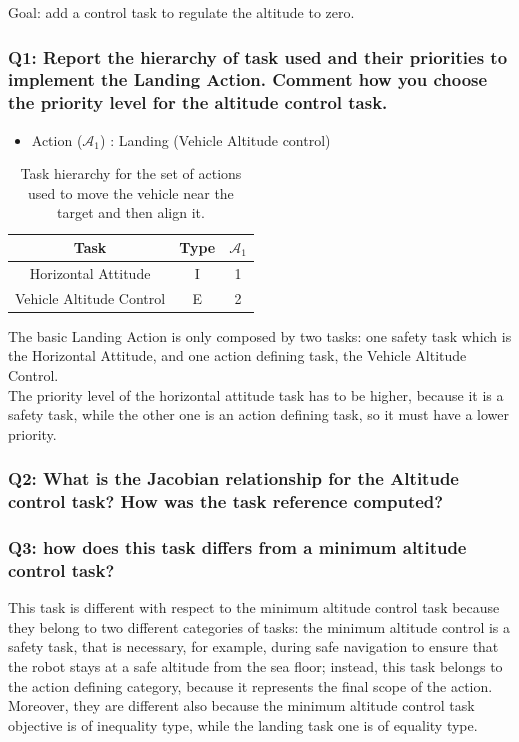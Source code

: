 \documentclass{article}
\begin{document}
Goal: add a control task to regulate the altitude to zero.

\subsubsection{Q1: Report the hierarchy of task used and their priorities to implement the Landing Action. Comment how you choose the priority level for the altitude control task.}

\begin{table}[htb]
	\caption{Task hierarchy for the set of actions used to move the vehicle near the target and then align it.}
	\begin{itemize}
		\item Action ($\mathcal{A}_{1}$) : Landing (Vehicle Altitude control)
	\end{itemize}
	\label{tb_align:actions_table}
	\begin{center}
		\footnotesize
		\begin{tabular}{ccc}
			\toprule
			Task & Type & $\mathcal{A}_{1}$ \\
			\midrule
			Horizontal Attitude             & I & 1 \\
			\hdashline
			Vehicle Altitude Control        & E & 2 \\
			\bottomrule
		\end{tabular}
	\end{center}
\end{table}
The basic Landing Action is only composed by two tasks: one safety task which is the Horizontal Attitude, and one action defining task, the Vehicle Altitude Control.\\
The priority level of the horizontal attitude task has to be higher, because it is a safety task, while the other one is an action defining task, so it must have a lower priority.

\subsubsection{Q2: What is the Jacobian relationship for the Altitude control task? How was the task reference computed?}


\subsubsection{Q3: how does this task differs from a minimum altitude control task?}
This task is different with respect to the minimum altitude control task because they belong to two different categories of tasks: the minimum altitude control is a safety task, that is necessary, for example, during safe navigation to ensure that the robot stays at a safe altitude from the sea floor; instead, this task belongs to the action defining category, because it represents the final scope of the action.\\
Moreover, they are different also because the minimum altitude control task objective is of inequality type, while the landing task one is of equality type.
\end{document}
